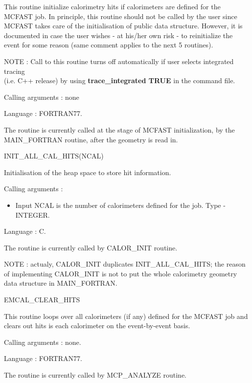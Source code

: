 This routine initialize calorimetry hits if calorimeters are defined for the
MCFAST job.  In principle, this routine should not be called by the user since 
MCFAST takes care of the initialisation of public data structure. However,
it is documented in case the user wishes - at his/her own risk - to reinitialize
the event for some reason (same comment applies to the next 5 routines).

NOTE : Call to this routine turns off automatically if user selects integrated tracing \\
(i.e. C++ release) by using {\bf trace\_integrated TRUE} in the command file. 

Calling arguments : none

Language : FORTRAN77.

The routine is currently called at the stage of MCFAST initialization, 
by the MAIN\_FORTRAN routine, after the geometry is read in.

\bigskip

\begin{center}
{INIT\_ALL\_CAL\_HITS(NCAL)}
\end{center}

Initialisation of the heap space to store hit information. 

Calling arguments : 
\begin{itemize}
\item {Input NCAL is the number of calorimeters defined for the job.
Type - INTEGER}.
\end{itemize}

Language : C.

The routine is currently called by CALOR\_INIT routine.

NOTE : actualy, CALOR\_INIT duplicates INIT\_ALL\_CAL\_HITS; the reason 
of implementing CALOR\_INIT is not to put the whole calorimetry geometry data 
structure in MAIN\_FORTRAN.

\bigskip

\begin{center}
{EMCAL\_CLEAR\_HITS}
\end{center}

This routine loops over all calorimeters (if any) defined for the MCFAST job and 
clears out hits is each calorimeter on the event-by-event basis.

Calling arguments : none.

Language : FORTRAN77.

The routine is currently called by MCP\_ANALYZE routine.

